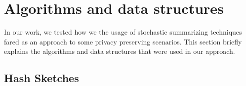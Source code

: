 

\section{Algorithms and data structures}
\label{sec:algorithms_and_data_structures}
In our work, we tested how we the usage of stochastic summarizing
techniques fared as an approach to some privacy preserving scenarios.
This section briefly explains the algorithms and data structures that
were used in our approach.

\subsection{Hash Sketches}
\label{sec:hash_sketches}

